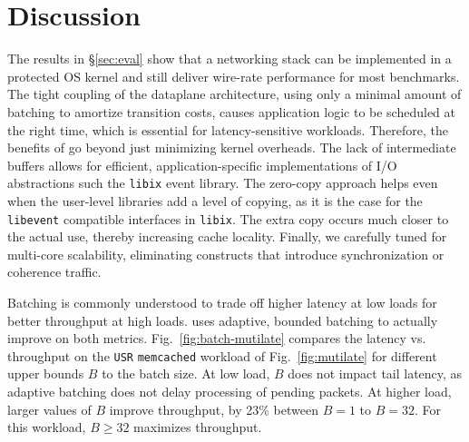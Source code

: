 
\section{Discussion}
\label{sec:disc}


 The results in \S\ref{sec:eval}
show that a networking stack can be implemented in a protected OS
kernel and still deliver wire-rate performance for most benchmarks.
The tight coupling of the dataplane architecture, using only a minimal
amount of batching to amortize transition costs, causes application
logic to be scheduled at the right time, which is essential for
latency-sensitive workloads.  Therefore, the benefits of \ix go beyond
just minimizing kernel overheads. The lack of intermediate buffers
allows for efficient, application-specific implementations of I/O
abstractions such the \texttt{libix} event library. The zero-copy
approach helps even when the user-level libraries add a level of
copying, as it is the case for the \texttt{libevent} compatible
interfaces in \texttt{libix}.  The extra copy occurs much closer to
the actual use, thereby increasing cache locality.  Finally, we
carefully tuned \ix for multi-core scalability, eliminating constructs
that introduce synchronization or coherence traffic.



 Batching is commonly
understood to trade off higher latency at low loads for better
throughput at high loads.  \ix uses adaptive, bounded batching to
actually improve on both metrics.  Fig.~\ref{fig:batch-mutilate}
compares the latency vs. throughput on the \texttt{USR}
\texttt{memcached} workload of Fig.~\ref{fig:mutilate} for different
upper bounds $B$ to the batch size.  At low load, $B$ does not impact
tail latency, as adaptive batching does not delay processing of
pending packets.  At higher load, larger values of $B$ improve
throughput, by 23\% between $B=1$ to $B=32$.  For this workload, $B
\ge 32$ maximizes throughput.


\begin{comment}
\myparagraph{Subtleties of adaptive batching:} 
Batching is commonly understood to trade off higher latency at low loads
for better throughput at high loads.  Our use of adaptive, bounded
batching actually improves on both metrics. In exploring the impact of
the batch size bound --- which impacts behavior when the workload is
CPU-bound --- we first confirmed the intuition that larger batch
sizes improve throughput, but only to a point. Fig.~\ref{fig:batch}
compares the throughput of the CPU-bound benchmark used in
Fig.~\ref{fig:short10:roundtrips}.  The experiment shows that batches
as low as $B=32$ can deliver maximal throughput for this
workload. (All experiments in \S\ref{sec:eval} were conducted with a
maximal batch size of $B=64$ packets per iteration.)  Because the
algorithm is adaptive, $B$ does not impact latency when the dataplane
is not saturated; we confirmed
this experimentally at the 99th percentile latency for
\texttt{memcache}.
\end{comment}


